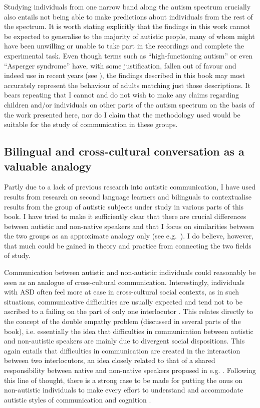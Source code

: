 Studying individuals from one narrow band along the autism spectrum crucially also entails not being able to make predictions about individuals from the rest of the spectrum. It is worth stating explicitly that the findings in this work cannot be expected to generalise to the majority of autistic people, many of whom might have been unwilling or unable to take part in the recordings and complete the experimental task. Even though terms such as ``high-functioning autism'' or even ``Asperger syndrome'' have, with some justification, fallen out of favour and indeed use in recent years (see ), the findings described in this book may most accurately represent the behaviour of adults matching just those descriptions. It bears repeating that I cannot and do not wish to make any claims regarding children and/or individuals on other parts of the autism spectrum on the basis of the work presented here, nor do I claim that the methodology used would be suitable for the study of communication in these groups.

\subsection{Bilingual and cross-cultural conversation as a valuable analogy}\label{Conclusion_discussion_L2}
\largerpage
Partly due to a lack of previous research into autistic communication, I have used results from research on second language learners and bilinguals to contextualise results from the group of autistic subjects under study in various parts of this book. I have tried to make it sufficiently clear that there are crucial differences between autistic and non-native speakers and that I focus on similarities between the two groups as an approximate analogy only (see e.g.~). I do believe, however, that much could be gained in theory and practice from connecting the two fields of study.

Communication between autistic and non-autistic individuals could reasonably be seen as an analogue of cross-cultural communication. Interestingly, individuals with ASD often feel more at ease in cross-cultural social contexts, as in such situations, communicative difficulties are usually expected and tend not to be ascribed to a failing on the part of only one interlocutor \citep{hillaryNeurodiversityCrossculturalCommunication2020}. This relates directly to the concept of the double empathy problem (discussed in several parts of the book), i.e. essentially the idea that difficulties in communication between autistic and non-autistic speakers are mainly due to divergent social dispositions. This again entails that difficulties in communication are created in the interaction between two interlocutors, an idea closely related to that of a shared responsibility between native and non-native speakers proposed in e.g. \citet{derwingPuttingAccentIts2009}. Following this line of thought, there is a strong case to be made for putting the onus on non-autistic individuals to make every effort to understand and accommodate autistic styles of communication and cognition \citep[cf.][]{mccrackenAutisticIdentityLanguage2021}. 

